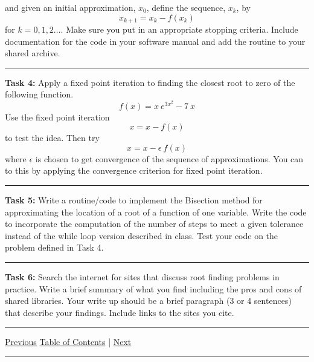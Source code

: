 \documentclass[10pt,fleqn]{article}
\begin{document}
\begin{trivlist}
\[    \]
    and given an initial approximation, \(x_0\), define the sequence, \(x_k\),
    by
    \[
      x_{k+1} = x_k - f(x_k)
    \]
    for \(k=0,1,2\ldots\). Make sure you put in an appropriate stopping
    criteria. Include documentation for the code in your software manual and add
    the routine to your shared archive.
\vskip0.1in\hrule\vskip0.1in \noindent
  \item[\bf Task 4:] Apply a fixed point iteration to finding the closest root
    to zero of the following function.
    \[
      f(x) = x\ e^{3x^2} - 7\ x
    \]
    Use the fixed point iteration
    \[
      x = x - f(x)
    \]
    to test the idea. Then try
    \[
      x = x - \epsilon\ f(x)
    \]
    where \(\epsilon\) is chosen to get convergence of the sequence of
    approximations. You can to this by applying the convergence criterion for
    fixed point iteration.
\vskip0.1in\hrule\vskip0.1in \noindent
  \item[\bf Task 5:] Write a routine/code to implement the Bisection method for
    approximating the location of a root of a function of one variable. Write
    the code to incorporate the computation of the number of steps to meet a
    given tolerance instead of the while loop version described in class. Test
    your code on the problem defined in Task 4.

\vskip0.1in\hrule\vskip0.1in \noindent
  \item[\bf Task 6:] Search the internet for sites that discuss root finding
        problems in practice. Write a brief summary of what you find including
        the pros and cons of shared libraries. Your write up should be a brief
        paragraph (3 or 4 sentences) that describe your findings. Include links
        to the sites you cite.
\end{trivlist}
\vskip0.1in\hrule\vskip0.1in \noindent
  \href{../../tasksheet_03/html/tasksheet_03.html}{Previous}
  \href{../../toc/md/tasksheet_toc.md}{Table of Contents} |
  \href{../../tasksheet_05/html/tasksheet_05.html}{Next}
\vskip0.1in\hrule\vskip0.1in \noindent
\end{document}
